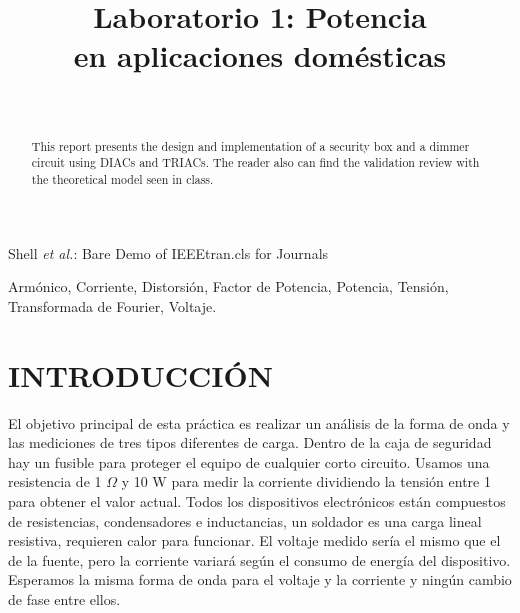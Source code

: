 \documentclass[journal]{IEEEtran}
\begin{document}
\title{\textbf{Laboratorio 1: Potencia \\ en aplicaciones domésticas}}
\author{
  \\
}

%
{Shell \MakeLowercase{\textit{et al.}}: Bare Demo of IEEEtran.cls 
for Journals}
	
\maketitle

\begin{abstract}
This report presents the design and implementation 
of a security box and a dimmer circuit using DIACs 
and TRIACs. The reader also can find  the validation 
review with the theoretical model seen in class.    
\end{abstract}


\begin{IEEEkeywords}  
Armónico, Corriente, Distorsión, Factor de Potencia,  Potencia, Tensión, Transformada de Fourier, Voltaje. 
\end{IEEEkeywords}

\IEEEpeerreviewmaketitle

\section{INTRODUCCIÓN}

El objetivo principal de esta práctica es realizar 
un análisis de la forma de onda y las mediciones 
de tres tipos diferentes de carga. Dentro de la caja 
de seguridad hay un fusible para proteger el equipo 
de cualquier corto circuito. Usamos una resistencia 
de 1 $\Omega$ y 10 W para medir la corriente dividiendo 
la tensión entre 1 para obtener el valor actual. 
Todos los dispositivos electrónicos están compuestos 
de resistencias, condensadores e inductancias, un 
soldador es una carga lineal resistiva, requieren calor 
para funcionar. El voltaje medido sería el mismo que 
el de la fuente, pero la corriente variará según el 
consumo de energía del dispositivo. Esperamos la misma 
forma de onda para el voltaje y la corriente y ningún 
cambio de fase entre ellos.\\
\end{document}
